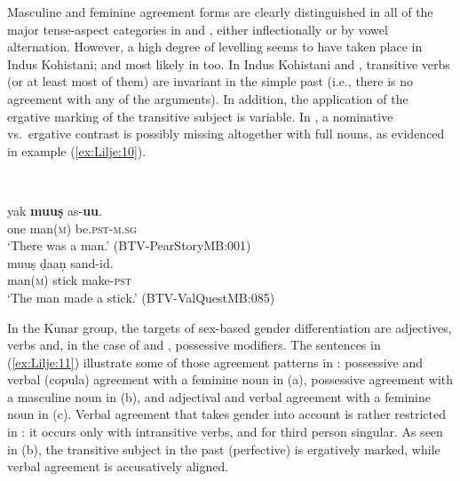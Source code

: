 \documentclass[output=collectionpaper]{langsci/langscibook}
\begin{document}
Masculine and feminine agreement forms are clearly distinguished in all of the major tense-aspect categories in  and , either inflectionally or by vowel alternation. However, a high degree of levelling seems to have taken place in Indus Kohistani; and most likely in  too. In Indus Kohistani and , transitive verbs (or at least most of them) are invariant in the simple past (i.e., there is no agreement with any of the arguments). In addition, the application of the ergative marking of the transitive subject is variable. In , a nominative vs.\ ergative contrast is possibly missing altogether with full nouns, as evidenced in example (\ref{ex:Lilje:10}).

\ea
\label{ex:Lilje:10}
\\
\begin{xlist}
\ex
\gll yak \textbf{muuṣ} as-\textbf{uu}.     \\
one man(\textsc{m}) be.\textsc{pst-m.sg}     \\
\glt `There was a man.' (BTV-PearStoryMB:001)\\
\ex
\gll muuṣ ḍaaṇ sand{}-id.     \\
man(\textsc{m}) stick make-\textsc{pst}     \\
\glt `The man made a stick.' (BTV-ValQuestMB:085)\\
\end{xlist}
\z

In the Kunar group, the targets of sex-based gender differentiation are adjectives, verbs and, in the case of  and , possessive modifiers. The sentences in (\ref{ex:Lilje:11}) illustrate some of those agreement patterns in : possessive and verbal (copula) agreement with a feminine noun in (a), possessive agreement with a masculine noun in (b), and adjectival and verbal agreement with a feminine noun in (c). Verbal agreement that takes gender into account is rather restricted in : it occurs only with intransitive verbs, and for third person singular. As seen in (b), the transitive subject in the past (perfective) is ergatively marked, while verbal agreement is accusatively aligned.
\end{document}

